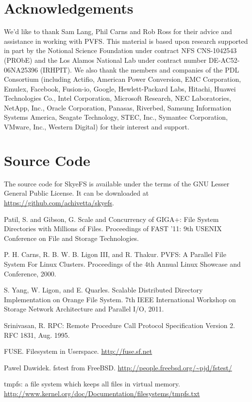 \documentclass[onecolumn, 11pt, letterpaper]{article}
\begin{document}
\section*{Acknowledgements}
We'd like to thank Sam Lang, Phil Carns and Rob Ross for their advice and
assistance in working with PVFS.  This material is based upon research
supported in part by the Notional Science Foundation under contract NFS
CNS-1042543 (PRObE) and the Los Alamos National Lab under contract number
DE-AC52-06NA25396 (IRHPIT).  We also thank the members and companies of the
PDL Consortium (including Actifio, American Power Conversion, EMC Corporation,
Emulex, Facebook, Fusion-io, Google, Hewlett-Packard Labs, Hitachi, Huawei
Technologies Co., Intel Corporation, Microsoft Research, NEC Laboratories,
NetApp, Inc., Oracle Corporation, Panasas, Riverbed, Samsung Information
Systems America, Seagate Technology, STEC, Inc., Symantec Corporation, VMware,
Inc., Western Digital) for their interest and support.

\section*{Source Code}
The source code for SkyeFS is available under the terms of the GNU Lesser
General Public License.  It can be downloaded at
\url{https://github.com/achivetta/skyefs}.

\begin{thebibliography}{9}

    Patil, S. and Gibson, G. Scale and Concurrency of GIGA+: File System
    Directories with Millions of Files.
    Proceedings of FAST '11: 9th USENIX Conference on File and Storage
    Technologies.

    P. H. Carns, R. B. W. B. Ligon III, and R. Thakur. PVFS: A Parallel File
    System For Linux Clusters. Proceedings of the 4th Annual Linux Showcase
    and Conference, 2000.

    S. Yang, W. Ligon, and E. Quarles. Scalable Distributed Directory
    Implementation on Orange File System. 7th IEEE International Workshop on
    Storage Network Architecture and Parallel I/O, 2011.

    Srinivasan, R. RPC: Remote Procedure Call Protocol Specification Version 2.
    RFC 1831, Aug. 1995.

    FUSE. Filesystem in Userspace. \url{http://fuse.sf.net}

    Pawel Dawidek.  fstest from FreeBSD.  \url{http://people.freebsd.org/~pjd/fstest/}
  
    tmpfs: a file system which keeps all files in virtual memory.
    \url{http://www.kernel.org/doc/Documentation/filesystems/tmpfs.txt}

\end{thebibliography}
\end{document}
